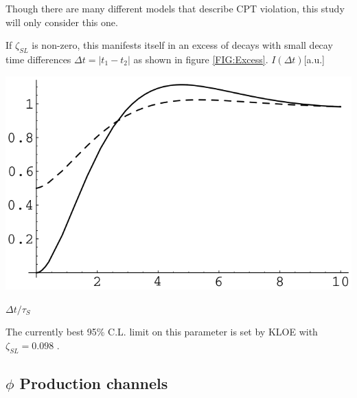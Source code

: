 Though there are many different models that describe CPT violation, this study will only consider this one. 

If $\zeta_{SL}$ is non-zero, this manifests itself in an excess of decays with small decay time differences $\Delta t = |t_1 - t_2|$ as shown in figure \ref{FIG:Excess}.
\newpage
\hspace*{3.2cm}$I(\Delta t)$[a.u.]
\vspace*{-.3cm}
\begin{center}
\includegraphics[width = .5\textwidth]{figs/Excess.png}
\end{center}
\vspace*{-.4cm}\hspace*{12cm}$\Delta t/\tau_S$

\vspace*{.5cm}

The currently best 95\% C.L. limit on this parameter is set by KLOE with $\zeta_{SL} = 0.098$ \cite{Ambrosino2006315}.


\subsection{$\phi$ Production channels}

